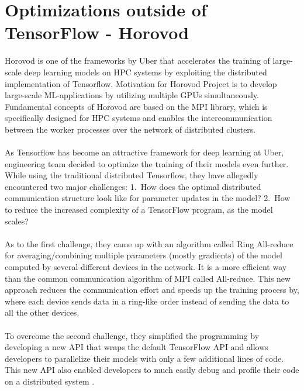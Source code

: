 \documentclass[ieeetran]{article}
\begin{document}
\section{Optimizations outside of TensorFlow - Horovod} %
\label{sec:optimization_outside_of_tensorFlow}
Horovod is one of the frameworks by Uber that accelerates the training of large-scale deep learning models on HPC systems by exploiting the distributed implementation of Tensorflow. Motivation for Horovod Project is to develop large-scale ML-applications by utilizing multiple GPUs simultaneously. Fundamental concepts of Horovod are based on the MPI library, which is specifically designed for HPC systems and enables the intercommunication between the worker processes over the network of distributed clusters.
\\ \\As Tensorflow has become an attractive framework for deep learning at Uber, engineering team decided to optimize the training of their models even further. While using the traditional distributed Tensorflow, they have allegedly encountered two major challenges: 1.\ How does the optimal distributed communication structure look like for parameter updates in the model? 2.\ How to reduce the increased complexity of a TensorFlow program, as the model scales?
\\ \\As to the first challenge, they came up with an algorithm called Ring All-reduce for averaging/combining multiple parameters (mostly gradients) of the model computed by several different devices in the network. It is a more efficient way than the common communication algorithm of MPI called All-reduce. This new approach reduces the communication effort and speeds up the training process by, where each device sends data in a ring-like order instead of sending the data to all the other devices.
\\ \\To overcome the second challenge, they simplified the programming by developing a new API that wraps the default TensorFlow API and allows developers to parallelize their models with only a few additional lines of code. This new API also enabled developers to much easily debug and profile their code on a distributed system .
\end{document}
